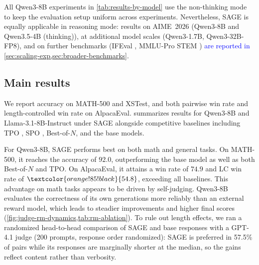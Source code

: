 \documentclass[letterpaper]{article} %
\newcommand{\method}{SAGE}
\begin{document}
All Qwen3-8B experiments in \cref{tab:results-by-model} use the non-thinking mode to keep the evaluation setup uniform across experiments. Nevertheless, \method{} is equally applicable in reasoning mode: results on AIME~2026 \citep{dekoninck2026beyond} (Qwen3-8B and Qwen3.5-4B (thinking)), at additional model scales (Qwen3-1.7B, Qwen3-32B-FP8), and on further benchmarks (IFEval \citep{zhou2023instruction}, MMLU-Pro STEM \citep{wang2024mmlu}) \textcolor{blue}{are reported in \cref{sec:scaling-exp,sec:broader-benchmarks}}.

\subsection{Main results}
\noindent We report accuracy on MATH-500 and XSTest, and both pairwise win rate and length-controlled win rate on AlpacaEval.  summarizes results for Qwen3-8B and Llama-3.1-8B-Instruct under \method{} alongside competitive baselines including TPO \citep{litest}, SPO \citep{xiang2025self}, Best-of-\(N\), and the base models.

For Qwen3-8B, \method{} performs best on both math and general tasks. On MATH-500, it reaches the accuracy of \(92.0\), outperforming the base model as well as both Best-of-\(N\) and TPO. On AlpacaEval, it attains a win rate of \(74.9\) and LC win rate of \(\textcolor{orange!85!black}{54.8}\), exceeding all baselines.  This advantage on math tasks appears to be driven by self-judging. Qwen3-8B evaluates the correctness of its own generations more reliably than an external reward model, which leads to steadier improvements and higher final scores (\cref{fig:judge-rm-dynamics,tab:rm-ablation}). \textcolor{green!50!black}{To rule out length effects, we ran a randomized head-to-head comparison of \method{} and base responses with a GPT-4.1 judge (200 prompts, response order randomized): \method{} is preferred in 57.5\% of pairs while its responses are marginally shorter at the median, so the gains reflect content rather than verbosity.}
\end{document}
